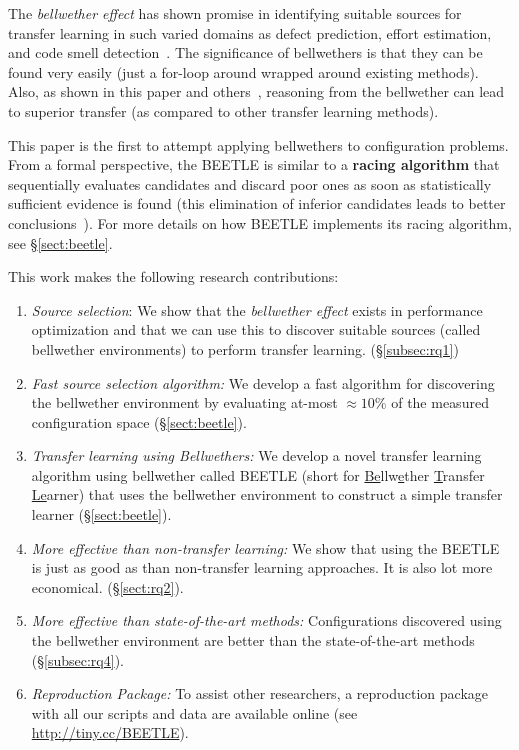 \documentclass[10pt,journal,compsoc]{IEEEtran}
\newcommand{\tion}[1]{\S\ref{sect:#1}}
\begin{document}
The \textit{bellwether effect} has shown promise in identifying suitable 
sources for transfer learning in such varied domains as defect prediction, 
effort estimation, and code smell detection~\cite{krishna18}.
The significance of bellwethers is that they can be found very easily
(just a for-loop around wrapped around existing methods). Also, as shown in this paper and
others~\cite{krishna16,mensah17a,mensah17b, krishna18}, reasoning from the bellwether can lead to superior transfer (as compared to other transfer learning methods).

This paper is the first to attempt applying bellwethers to configuration problems. 
From a formal perspective, the BEETLE is similar to a  {\bf racing algorithm}
that sequentially evaluates candidates and discard poor ones as soon as statistically sufficient evidence is found (this elimination of inferior candidates leads to better conclusions~\cite{birattari2002racing}).
For more details on how BEETLE implements its racing algorithm, see \tion{beetle}.

This work  makes the  following research contributions: 
\begin{enumerate}[leftmargin=*]
\item \textit{Source selection}: We show that the \textit{bellwether effect} exists in performance optimization and that we can use this to discover suitable sources (called bellwether environments) to perform transfer learning. (\S\ref{subsec:rq1})
\item \textit{Fast source selection algorithm:} We develop a fast algorithm for discovering the bellwether environment by evaluating at-most $\approx10\%$ of the measured configuration space (\S\ref{sect:beetle}).
\item \textit{Transfer learning using Bellwethers:} We develop a novel transfer 
learning algorithm using bellwether called BEETLE (short for  
\underline{Be}llw\underline{e}ther \underline{T}ransfer \underline{Le}arner)
that uses the bellwether environment to construct a simple transfer learner 
(\S\ref{sect:beetle}).
\item \textit{More effective than non-transfer learning: } We show that using the BEETLE is just as good as than non-transfer learning approaches. It is also lot more economical. (\S\ref{sect:rq2}).
\item \textit{More effective than state-of-the-art methods: } Configurations discovered using the bellwether environment are better than the state-of-the-art 
methods~\cite{valov2017transferring, jamshidi2017transfer} (\S\ref{subsec:rq4}).

\item \textit{Reproduction Package: } To assist other researchers, a reproduction package with all our scripts and data are available online (see \url{http://tiny.cc/BEETLE}).
\end{enumerate}
\end{document}
